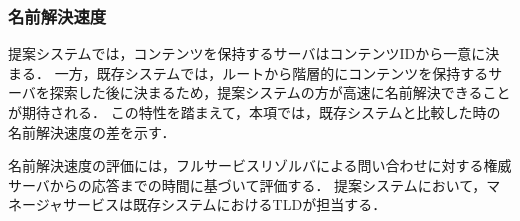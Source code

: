 \newpage
\subsubsection{名前解決速度}
\label{sec:resolution_speed}
提案システムでは，コンテンツを保持するサーバはコンテンツIDから一意に決まる．
一方，既存システムでは，ルートから階層的にコンテンツを保持するサーバを探索した後に決まるため，提案システムの方が高速に名前解決できることが期待される．
この特性を踏まえて，本項では，既存システムと比較した時の名前解決速度の差を示す．

名前解決速度の評価には，フルサービスリゾルバによる問い合わせに対する権威サーバからの応答までの時間に基づいて評価する．
提案システムにおいて，マネージャサービスは既存システムにおけるTLDが担当する．

